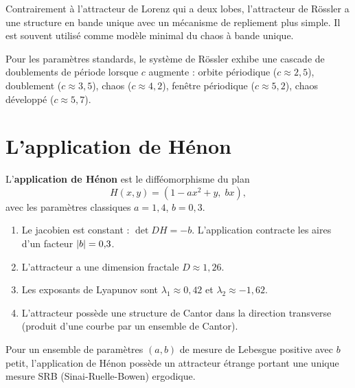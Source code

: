 \begin{remarque}
Contrairement \`a l'attracteur de Lorenz qui a deux lobes, l'attracteur de
R\"ossler a une structure en bande unique avec un m\'ecanisme de repliement
plus simple. Il est souvent utilis\'e comme mod\`ele minimal du chaos \`a
bande unique.
\end{remarque}

\begin{proposition}
Pour les param\`etres standards, le syst\`eme de R\"ossler exhibe une cascade
de doublements de p\'eriode lorsque $c$ augmente : orbite p\'eriodique
($c \approx 2{,}5$), doublement ($c \approx 3{,}5$), chaos ($c \approx 4{,}2$),
fen\^etre p\'eriodique ($c \approx 5{,}2$), chaos d\'evelopp\'e ($c \approx 5{,}7$).
\end{proposition}

\section{L'application de H\'enon}

\begin{definition}
L'\textbf{application de H\'enon} est le diff\'eomorphisme du plan
\[
    H(x, y) = (1 - ax^2 + y, \; bx),
\]
avec les param\`etres classiques $a = 1{,}4$, $b = 0{,}3$.
\end{definition}

\begin{proposition}
\begin{enumerate}
    \item Le jacobien est constant : $\det DH = -b$. L'application contracte
    les aires d'un facteur $\left| b \right| = 0{,}3$.
    \item L'attracteur a une dimension fractale $D \approx 1{,}26$.
    \item Les exposants de Lyapunov sont $\lambda_1 \approx 0{,}42$ et
    $\lambda_2 \approx -1{,}62$.
    \item L'attracteur poss\`ede une structure de Cantor dans la direction
    transverse (produit d'une courbe par un ensemble de Cantor).
\end{enumerate}
\end{proposition}

\begin{theoreme}
Pour un ensemble de param\`etres $(a, b)$ de mesure de Lebesgue positive avec
$b$ petit, l'application de H\'enon poss\`ede un attracteur \'etrange portant
une unique mesure SRB (Sinai-Ruelle-Bowen) ergodique.
\end{theoreme}

